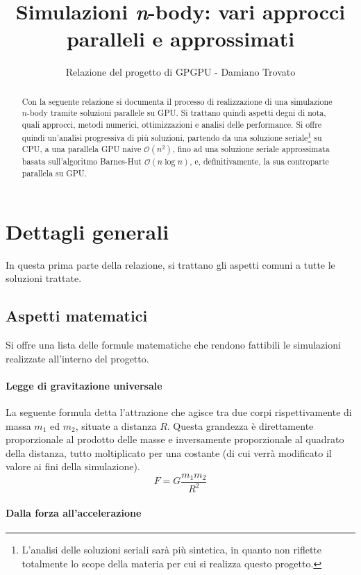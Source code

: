 \documentclass{article}
\title{\Huge \textbf{Simulazioni \textit{n}-body: vari approcci paralleli e approssimati}}
\author{Relazione del progetto di GPGPU - Damiano Trovato}
\date{}
\begin{document}
	\maketitle
	\begin{abstract}
	Con la seguente relazione si documenta il processo di realizzazione di una simulazione $n$-body tramite soluzioni parallele su GPU. Si trattano quindi aspetti degni di nota, quali approcci, metodi numerici, ottimizzazioni e analisi delle performance. Si offre quindi un'analisi progressiva di più soluzioni, partendo da una soluzione seriale\footnote{L'analisi delle soluzioni seriali sarà più sintetica, in quanto non riflette totalmente lo scope della materia per cui si realizza questo progetto.} su CPU, a una parallela GPU naive $\mathcal{O}(n^2)$, fino ad una soluzione seriale approssimata basata sull'algoritmo Barnes-Hut $\mathcal{O}(n\log n)$, e, definitivamente, la sua controparte parallela su GPU. 
	\end{abstract}
	
	\section{Dettagli generali}
	In questa prima parte della relazione, si trattano gli aspetti comuni a tutte le soluzioni trattate.
	
	\subsection{Aspetti matematici}
	Si offre una lista delle formule matematiche che rendono fattibili le simulazioni realizzate all'interno del progetto.
	
	\paragraph{Legge di gravitazione universale} La seguente formula detta l'attrazione che agisce tra due corpi rispettivamente di massa $m_1$ ed $m_2$, situate a distanza $R$. Questa grandezza è direttamente proporzionale al prodotto delle masse e inversamente proporzionale al quadrato della distanza, tutto moltiplicato per una costante (di cui verrà modificato il valore ai fini della simulazione).
	$$
	F = G \frac{m_1m_2}{R^2}
	$$
	
	\paragraph{Dalla forza all'accelerazione}
	
\end{document}
